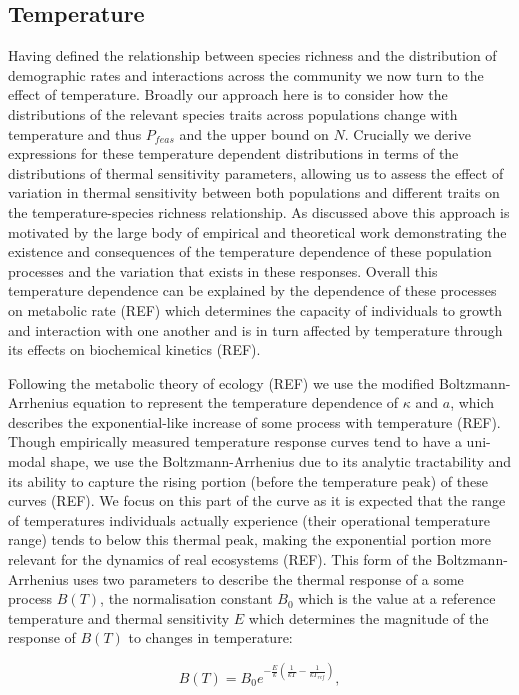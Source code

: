 \documentclass{article}
\begin{document}
\subsection{Temperature} \label{SEC:Temperature}
Having defined the relationship between species richness and the distribution of demographic rates and interactions across the community we now turn to the effect of temperature. Broadly our approach here is to consider how the distributions of the relevant species traits across populations change with temperature and thus $P_{feas}$ and the upper bound on $N$. Crucially we derive expressions for these temperature dependent distributions in terms of the distributions of thermal sensitivity parameters, allowing us to assess the effect of variation in thermal sensitivity between both populations and different traits on the temperature-species richness relationship. As discussed above this approach is motivated by the large body of empirical and theoretical work demonstrating the existence and consequences of the temperature dependence of these population processes and the variation that exists in these responses. Overall this temperature dependence can be explained by the dependence of these processes on metabolic rate (REF) which determines the capacity of individuals to growth and interaction with one another and is in turn affected by temperature through its effects on biochemical kinetics (REF).

Following the metabolic theory of ecology (REF) we use the modified Boltzmann-Arrhenius equation to represent the temperature dependence of $\kappa$ and $a$, which describes the exponential-like increase of some process with temperature (REF). Though empirically measured temperature response curves tend to have a uni-modal shape, we use the Boltzmann-Arrhenius due to its analytic tractability and its ability to capture the rising portion (before the temperature peak) of these curves (REF). We focus on this part of the curve as it is expected that the range of temperatures individuals actually experience (their operational temperature range) tends to below this thermal peak, making the exponential portion more relevant for the dynamics of real ecosystems (REF). This form of the Boltzmann-Arrhenius uses two parameters to describe the thermal response of a some process $B(T)$, the normalisation constant $B_0$ which is the value at a reference temperature and thermal sensitivity $E$ which determines the magnitude of the response of $B(T)$ to changes in temperature:

\begin{equation} \label{EQ:Boltzmann}
    B(T) = B_0 e^{-\frac{E}{k} \left(\frac{1}{kT} - \frac{1}{k T_{ref} }\right)},
\end{equation}
\end{document}
